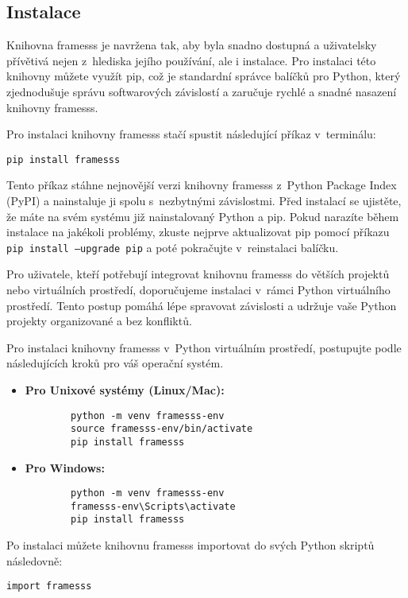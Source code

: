 \subsection{Instalace} \label{sec:framesss_instalation}

Knihovna framesss je navržena tak, aby byla snadno dostupná a uživatelsky přívětivá nejen z~hlediska jejího používání, ale i instalace. Pro instalaci této knihovny můžete využít pip, což je standardní správce balíčků pro Python, který zjednodušuje správu softwarových závislostí a zaručuje rychlé a snadné nasazení knihovny framesss.

Pro instalaci knihovny framesss stačí spustit následující příkaz v~terminálu:

\begin{verbatim}
pip install framesss
\end{verbatim}

Tento příkaz stáhne nejnovější verzi knihovny framesss z~Python Package Index (PyPI) a nainstaluje ji spolu s~nezbytnými závislostmi. Před instalací se ujistěte, že máte na svém systému již nainstalovaný Python a pip. Pokud narazíte během instalace na jakékoli problémy, zkuste nejprve aktualizovat pip pomocí příkazu \texttt{pip install --upgrade pip} a poté pokračujte v~reinstalaci balíčku.

Pro uživatele, kteří potřebují integrovat knihovnu framesss do větších projektů nebo virtuálních prostředí, doporučujeme instalaci v~rámci Python virtuálního prostředí. Tento postup pomáhá lépe spravovat závislosti a udržuje vaše Python projekty organizované a bez konfliktů.

Pro instalaci knihovny framesss v~Python virtuálním prostředí, postupujte podle následujících kroků pro váš operační systém.


\begin{itemize}
    \item \textbf{Pro Unixové systémy (Linux/Mac):}
        \begin{verbatim}
        python -m venv framesss-env
        source framesss-env/bin/activate
        pip install framesss
        \end{verbatim}
    
    \item \textbf{Pro Windows:}
        \begin{verbatim}
        python -m venv framesss-env
        framesss-env\Scripts\activate
        pip install framesss
        \end{verbatim}
\end{itemize}

Po instalaci můžete knihovnu framesss importovat do svých Python skriptů následovně:

\begin{verbatim}
import framesss
\end{verbatim}

